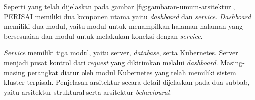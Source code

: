 Seperti yang telah dijelaskan pada gambar \ref{fig:gambaran-umum-arsitektur}, PERISAI memiliki dua komponen utama yaitu \textit{dashboard} dan \textit{service}. \textit{Dashboard} memiliki dua modul, yaitu modul untuk menampilkan halaman-halaman yang bersesuaian dan modul untuk melakukan koneksi dengan \textit{service}.

\textit{Service} memiliki tiga modul, yaitu server, \textit{database}, serta Kubernetes. Server menjadi pusat kontrol dari \textit{request} yang dikirimkan melalui \textit{dashboard}. Masing-masing perangkat diatur oleh modul Kubernetes yang telah memiliki sistem kluster terpisah. Penjelasan arsitektur secara detail dijelaskan pada dua subbab, yaitu arsitektur struktural serta arsitektur \textit{behavioural}.



